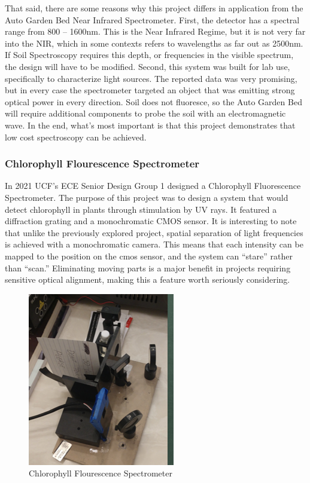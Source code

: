That said, there are some reasons why this project differs in application from the Auto Garden Bed Near Infrared Spectrometer. First, the detector has a spectral range from 800 – 1600nm. This is the Near Infrared Regime, but it is not very far into the NIR, which in some contexts refers to wavelengths as far out as 2500nm. If Soil Spectroscopy requires this depth, or frequencies in the visible spectrum, the design will have to be modified. Second, this system was built for lab use, specifically to characterize light sources. The reported data was very promising, but in every case the spectrometer targeted an object that was emitting strong optical power in every direction. Soil does not fluoresce, so the Auto Garden Bed will require additional components to probe the soil with an electromagnetic wave. In the end, what’s most important is that this project demonstrates that low cost spectroscopy can be achieved.


\subsubsection{Chlorophyll Flourescence Spectrometer}



In 2021 UCF’s ECE Senior Design Group 1 designed a Chlorophyll Fluorescence Spectrometer. The purpose of this project was to design a system that would detect chlorophyll in plants through stimulation by UV rays. It featured a diffraction grating and a monochromatic CMOS sensor. It is interesting to note that unlike the previously explored project, spatial separation of light frequencies is achieved with a monochromatic camera. This means that each intensity can be mapped to the position on the cmos sensor, and the system can “stare” rather than “scan.” Eliminating moving parts is a major benefit in projects requiring sensitive optical alignment, making this a feature worth seriously considering.

\begin{figure}[H]
    \caption{Chlorophyll Flourescence Spectrometer}
    \centering
    \includegraphics[width=.6\textwidth]{images/3-1-2Pic.png}
\end{figure}

